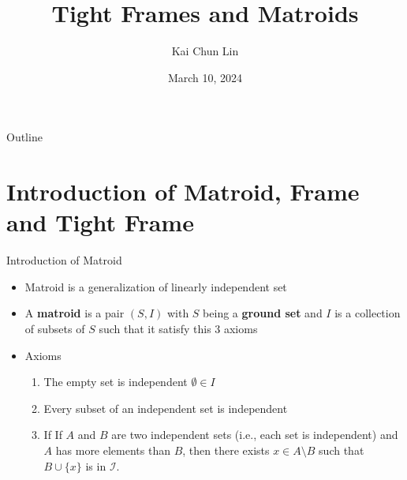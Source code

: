 \documentclass{beamer}
\title[Short Title]{Tight Frames and Matroids}
\author{Kai Chun Lin}
\institute{Rose-Hulman Institute of Technology}
\date{ March 10, 2024}
\begin{document}
\begin{frame}
  \titlepage
\end{frame}

\begin{frame}{Outline}
  \tableofcontents
\end{frame}


\section{Introduction of Matroid, Frame and Tight Frame}
\begin{frame}{Introduction of Matroid}
 \begin{itemize}
    \item Matroid is a generalization of linearly independent set
    \item A \textbf{matroid} is a pair $(S,I)$ with $S$ being a \textbf{ground set} and $I$ is a collection of subsets of $S$ such that it satisfy this 3 axioms
     \item Axioms
     
      \begin{enumerate}
      
        \item The empty set is independent $\emptyset \in \textit{I}$
        \item Every subset of an independent set is independent
        \item If If $A$ and $B$ are two independent sets (i.e., each set is independent) and $A$ has more elements than $B$, then there exists $x \in A \setminus B$ such that $B \cup \{x\}$ is in $\mathcal{I}$.
        \cite{oxley2003matroid}
    \end{enumerate}
  \end{itemize}
\end{frame}
\end{document}
